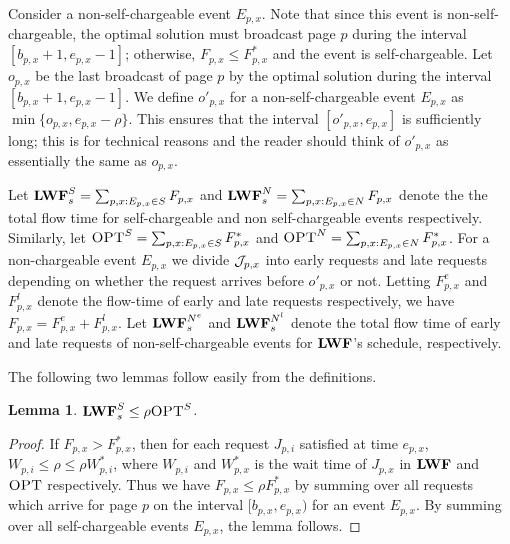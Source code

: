 \documentclass[11pt]{article}
\newtheorem{lemma}{Lemma}[section]
\newcommand{\opt}{\textrm{\sc OPT}}
\newcommand{\len}{\mathfrak{\rho}}
\newcommand{\fe}{F^e}
\newcommand{\fl}{F^l}
\newcommand{\lwfne}{\lwf^{N^e}}
\newcommand{\lwfnl}{\lwf^{N^l}}
\newcommand{\cJ}{{\cal J}}
\begin{document}
\begin{titlepage}
\iffalse The intuition behind this distinction is that for self-chargeable events the flow time $\lwf_s$ accumulates
during $E_{p,x}$ for page $p$ can be ``charged'' to the flow time the optimal solution accumulates for page $p$ during
the event. For non-self-chargeable events, the flow time will not be charged directly to the optimal solution's flow
time. \fi


Consider a non-self-chargeable event $E_{p,x}$.  Note that since this
event is non-self-chargeable, the optimal solution must broadcast page
$p$ during the interval $[b_{p,x}+1, e_{p,x}-1]$; otherwise, $F_{p,x}
\le F^*_{p,x}$ and the event is self-chargeable.  Let $o_{p,x}$ be the
last broadcast of page $p$ by the optimal solution during the interval
$[b_{p,x}+1, e_{p,x}-1]$. We define $o'_{p,x}$ for a
non-self-chargeable event $E_{p,x}$ as $\min\{o_{p,x}, e_{p,x} -
\len\}$. This ensures that the interval $[o'_{p,x},e_{p,x}]$ is
sufficiently long; this is for technical reasons and the reader should
think of $o'_{p,x}$ as essentially the same as $o_{p,x}$.

Let ${\texttt{\bf{LWF}}}^{S}_s = \sum_{p,x:E_{p,x} \in S} F_{p,x}$ and ${\texttt{\bf{LWF}}}_s^{N} =
\sum_{p,x: E_{p,x} \in N} F_{p,x}$ denote the the total flow time for
self-chargeable and non self-chargeable events
respectively. Similarly, let $\opt^{S} = \sum_{p,x: E_{p,x} \in S}
F^*_{p,x}$ and $\opt^{N} = \sum_{p,x: E_{p,x} \in N} F^*_{p,x}$.  For
a non-chargeable event $E_{p,x}$ we divide $\cJ_{p,x}$ into early
requests and late requests depending on whether the request arrives
before $o'_{p,x}$ or not.  Letting $\fe_{p,x}$ and $\fl_{p,x}$ denote
the flow-time of early and late requests respectively, we have
$F_{p,x} = \fe_{p,x} + \fl_{p,x}$. Let $\lwfne_s$ and $\lwfnl_s$
denote the total flow time of early and late requests of
non-self-chargeable events for ${\texttt{\bf{LWF}}}$'s schedule,
respectively.

The following two lemmas follow easily from the definitions.

\begin{lemma} \label{lem:SC} $\lwf_s^{S} \leq \len \opt^{S}$.
\vspace{-1mm}
\end{lemma}


\iffalse
\begin{proof}
  If $F_{p,x} > F^*_{p,x}$, then for each request $J_{p,i}$ satisfied
  at time $e_{p,x}$, $W_{p,i} \leq \len \leq \len W^*_{p,i}$, where
  $W_{p,i}$ and $W^*_{p,x}$ is the wait time of $J_{p,x}$ in ${\texttt{\bf{LWF}}}$
  and $\opt$ respectively. Thus we have $F_{p,x} \leq \len F^*_{p,x}$
  by summing over all requests which arrive for page $p$ on the
  interval $[b_{p,x} , e_{p,x})$ for an event $E_{p,x}$. By summing
  over all self-chargeable events $E_{p,x}$, the lemma
  follows. \end{proof}


\end{titlepage}
\end{document}
